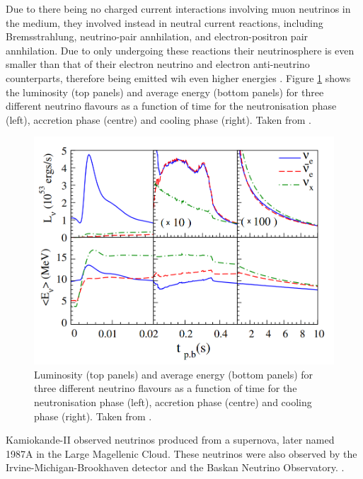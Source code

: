 Due to there being no charged current interactions involving muon neutrinos in the medium, they involved instead in neutral current reactions, including Bremsstrahlung, neutrino-pair annhilation, and electron-positron pair annhilation. Due to only undergoing these reactions their neutrinosphere is even smaller than that of their electron neutrino and electron anti-neutrino counterparts, therefore being emitted wih even higher energies \cite{nagakura_non-thermal_2021}. Figure \ref{fig:ccsn_nu_flavor_energy} shows the luminosity (top panels) and average energy (bottom panels) for three different neutrino flavours as a function of time for the neutronisation phase (left), accretion phase (centre) and cooling phase (right). Taken from \cite{chakraborty_observing_2014}.

\begin{figure}
    \includegraphics[width=\textwidth]{Figures/ccsn_nu_flavor_energy}
    \caption{Luminosity (top panels) and average energy (bottom panels) for three different neutrino flavours as a function of time for the neutronisation phase (left), accretion phase (centre) and cooling phase (right). Taken from \cite{chakraborty_observing_2014}. }
    \label{fig:ccsn_nu_flavor_energy}
\end{figure}



Kamiokande-II observed neutrinos produced from a supernova, later named 1987A in the Large Magellenic Cloud. These neutrinos were also observed by the Irvine-Michigan-Brookhaven detector and the Baskan Neutrino Observatory. \cite{hirata_observation_1987}.

